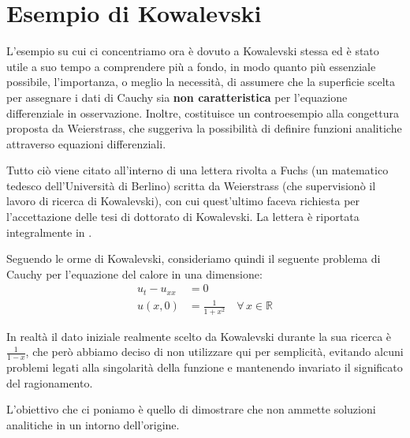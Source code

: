 \newpage
\section{Esempio di Kowalevski}

L'esempio su cui ci concentriamo ora è dovuto a Kowalevski stessa ed è stato utile a suo tempo a comprendere più a fondo, in modo quanto più essenziale possibile, l'importanza, o meglio la necessità, di assumere che la superficie scelta per assegnare i dati di Cauchy sia \textbf{non caratteristica} per l'equazione differenziale in osservazione. Inoltre, costituisce un controesempio alla congettura proposta da Weierstrass, che suggeriva la possibilità di definire funzioni analitiche attraverso equazioni differenziali. 

Tutto ciò viene citato all'interno di una lettera rivolta a Fuchs (un matematico tedesco dell'Università di Berlino) scritta da Weierstrass (che supervisionò il lavoro di ricerca di  Kowalevski), con cui quest'ultimo faceva richiesta per l'accettazione delle tesi di dottorato di Kowalevski. La lettera è riportata integralmente in \cite[app.C]{Bio}.
 
Seguendo le orme di Kowalevski, consideriamo quindi il seguente problema di Cauchy per l'equazione del calore in una dimensione:
\begin{align}
\label{eq:1}
u_t-u_{xx}&=0\\ 
\label{eq:2}
u(x,0)&=\frac{1}{1+x^2} \quad \forall \, x \in \mathbb{R}
\end{align}
\begin{remark}
In realtà il dato iniziale realmente scelto da Kowalevski durante la sua ricerca è $\frac{1}{1-x}$, che però abbiamo deciso di non utilizzare qui per semplicità, evitando alcuni problemi legati alla singolarità della funzione e mantenendo invariato il significato del ragionamento.
\end{remark}
L'obiettivo che ci poniamo è quello di dimostrare che non ammette soluzioni analitiche in un intorno dell'origine.

